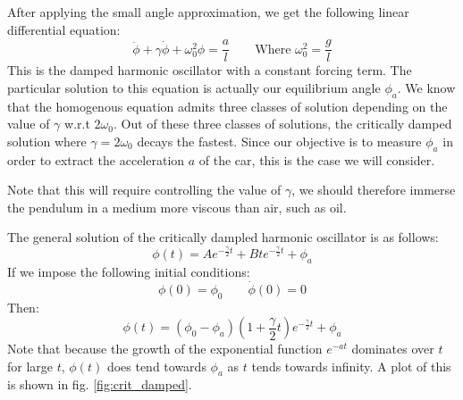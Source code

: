 \documentclass{article}
\begin{document}
After applying the small angle approximation, we get the following linear differential equation:
\begin{equation}
    \ddot \phi + \gamma \dot \phi + \omega_0^2 \phi = \frac{a}{l}
    \qquad
    \textrm{Where } \omega_0^2 = \frac{g}{l}
\end{equation}
This is the damped harmonic oscillator with a constant forcing term. The particular solution to this equation is actually our equilibrium angle $\phi_a$.
We know that the homogenous equation admits three classes of solution depending on the value of $\gamma$ w.r.t $2\omega_0$. 
Out of these three classes of solutions, the critically damped solution where $\gamma = 2\omega_0$ decays the fastest. 
Since our objective is to measure $\phi_a$ in order to extract the acceleration $a$ of the car, this is the case we will consider.

Note that this will require controlling the value of $\gamma$, we should therefore immerse the pendulum in a medium more viscous than air, such as oil.

The general solution of the critically dampled harmonic oscillator is as follows:
\begin{equation}
    \phi(t) = Ae^{-\frac{\gamma}{2}t} + Bte^{-\frac{\gamma}{2}t} + \phi_a
\end{equation}
If we impose the following initial conditions:
\begin{equation}
    \phi(0) = \phi_0 \qquad \dot\phi(0) = 0
\end{equation}
Then:
\begin{equation}
    \phi(t) = (\phi_0 - \phi_a)(1 + \frac{\gamma}{2}t)e^{-\frac{\gamma}{2}t} + \phi_a
\end{equation}
Note that because the growth of the exponential function $e^{-at}$ dominates over $t$ for large $t$, $\phi(t)$ does tend towards $\phi_a$ as $t$ tends towards infinity. 
A plot of this is shown in fig. \ref{fig:crit_damped}.
\end{document}
